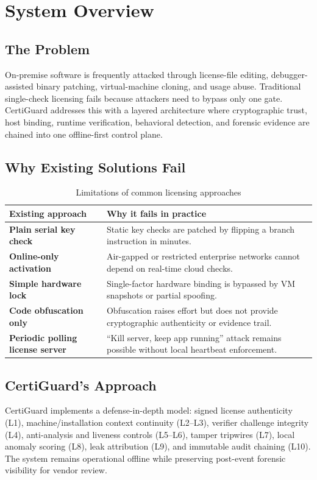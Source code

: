 \documentclass[11pt,a4paper]{article}
\begin{document}
\tableofcontents
\newpage

\section{System Overview}

\subsection{The Problem}
On-premise software is frequently attacked through license-file editing, debugger-assisted binary patching, virtual-machine cloning, and usage abuse. Traditional single-check licensing fails because attackers need to bypass only one gate. CertiGuard addresses this with a layered architecture where cryptographic trust, host binding, runtime verification, behavioral detection, and forensic evidence are chained into one offline-first control plane.

\subsection{Why Existing Solutions Fail}
\begin{table}[H]
\centering
\caption{Limitations of common licensing approaches}
\begin{tabularx}{\textwidth}{>{\bfseries}lY}
\toprule
Existing approach & Why it fails in practice \\
\midrule
Plain serial key check & Static key checks are patched by flipping a branch instruction in minutes. \\
Online-only activation & Air-gapped or restricted enterprise networks cannot depend on real-time cloud checks. \\
Simple hardware lock & Single-factor hardware binding is bypassed by VM snapshots or partial spoofing. \\
Code obfuscation only & Obfuscation raises effort but does not provide cryptographic authenticity or evidence trail. \\
Periodic polling license server & ``Kill server, keep app running'' attack remains possible without local heartbeat enforcement. \\
\bottomrule
\end{tabularx}
\end{table}

\subsection{CertiGuard's Approach}
CertiGuard implements a defense-in-depth model: signed license authenticity (L1), machine/installation context continuity (L2--L3), verifier challenge integrity (L4), anti-analysis and liveness controls (L5--L6), tamper tripwires (L7), local anomaly scoring (L8), leak attribution (L9), and immutable audit chaining (L10). The system remains operational offline while preserving post-event forensic visibility for vendor review.
\end{document}
